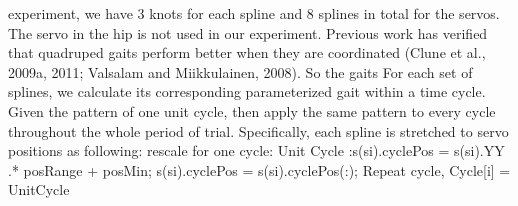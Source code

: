 experiment, we have 3 knots for each spline and 8 splines in total for the servos. The servo in the hip is not used in our experiment. Previous work has verified that quadruped gaits perform better when they are coordinated (Clune et al., 2009a, 2011; Valsalam and Miikkulainen, 2008). So the gaits For each set of splines, we calculate its corresponding parameterized gait within a time cycle. Given the pattern of one unit cycle, then apply the same pattern to every cycle throughout the whole period of trial. Specifically, each spline is stretched to servo positions as following:   rescale for one cycle: 	Unit Cycle :s(si).cyclePos = s(si).YY .* posRange + posMin;    		s(si).cyclePos = s(si).cyclePos(:);    	Repeat cycle,      	Cycle[i] = UnitCycle%
